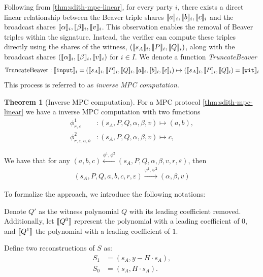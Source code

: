 \documentclass[11pt]{report}
\theoremstyle{definition}
\newtheorem{theorem}{Theorem}[section]
\theoremstyle{plain}
\begin{document}
Following from \autoref{thm:sdith-mpc-linear}, for every party $i$, there exists a direct linear relationship between the Beaver triple shares $\llbracket a \rrbracket_i, \llbracket b \rrbracket_i, \llbracket c \rrbracket_i$ and the broadcast shares $\llbracket \alpha \rrbracket_i, \llbracket \beta \rrbracket_i, \llbracket v \rrbracket_i$. This observation enables the removal of Beaver triples within the signature. Instead, the verifier can compute these triples directly using the shares of the witness, $(\llbracket s_A \rrbracket_i, \llbracket P \rrbracket_i, \llbracket Q \rrbracket_i)$, along with the broadcast shares $(\llbracket \alpha \rrbracket_i, \llbracket \beta \rrbracket_i, \llbracket v \rrbracket_i)$ for $i \in I$. We denote a function \textit{TruncateBeaver}
\begin{align}
  \text{TruncateBeaver} : \llbracket \texttt{input} \rrbracket_i = (\llbracket s_A \rrbracket_i, \llbracket P \rrbracket_i, \llbracket Q \rrbracket_i, \llbracket a \rrbracket_i, \llbracket b \rrbracket_i, \llbracket c \rrbracket_i) \mapsto (\llbracket s_A \rrbracket_i, \llbracket P \rrbracket_i, \llbracket Q \rrbracket_i) = \llbracket \texttt{wit} \rrbracket_i\label{eq:truncate_beaver}
\end{align}
This process is referred to as \textit{inverse MPC computation}.

\begin{theorem}[Inverse MPC computation]\label{thm:mpc_inverse}
  For a MPC protocol \autoref{thm:sdith-mpc-linear} we have a inverse MPC computation with two functions
  \begin{align}
    \phi^1_{r,\varepsilon}        & : (s_A, P, Q, \alpha, \beta, v) \mapsto (a, b), \\
    \phi^2_{r, \varepsilon, a, b} & : (s_A, P, Q, \alpha, \beta, v) \mapsto c,
  \end{align}

  We have that for any $(a,b,c) \stackrel{\phi^1, \phi^2}{\longleftarrow} (s_A, P, Q, \alpha, \beta, v, r, \varepsilon)$, then
  \begin{align*}
    (s_A, P, Q, a, b, c, r, \varepsilon) \stackrel{\varphi^1, \varphi^2}{\longrightarrow} (\alpha, \beta, v)
  \end{align*}
\end{theorem}

To formalize the approach, we introduce the following notations:

Denote $Q'$ as the witness polynomial $Q$ with its leading coefficient removed. Additionally, let $\llbracket Q^0 \rrbracket$ represent the polynomial with a leading coefficient of $0$, and $\llbracket Q^1 \rrbracket$ the polynomial with a leading coefficient of $1$.

Define two reconstructions of $S$ as:
\begin{align*}
  S_1 & = (s_A, y - H \cdot s_A), \\
  S_0 & = (s_A, H \cdot s_A).
\end{align*}
\end{document}

